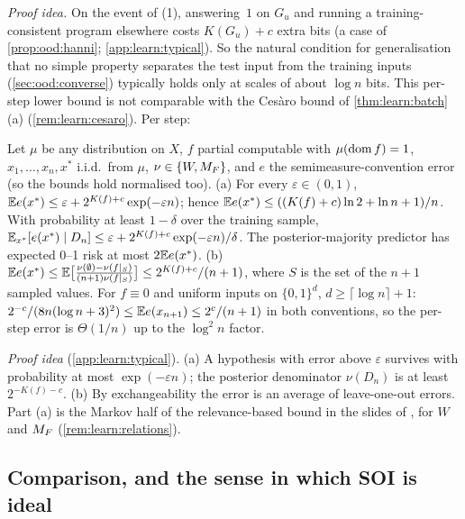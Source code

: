 \emph{Proof idea.} On the event of (1), answering~$1$ on $G_u$ and running a training-consistent program elsewhere costs $K(G_u)+c$ extra bits (a case of \cref{prop:ood:hanni}; \cref{app:learn:typical}). So the natural condition for generalisation that no simple property separates the test input from the training inputs (\cref{sec:ood:converse}) typically holds only at scales of about $\log n$ bits. This per-step lower bound is not comparable with the Ces\`aro bound of \cref{thm:learn:batch}(a) (\cref{rem:learn:cesaro}). Per step:

\begin{corollary}\label{cor:learn:perstep}
Let $\mu$ be any distribution on $X$, $f$ partial computable with $\mu(\operatorname{dom} f)=1$, $x_1,\dots,x_n,x^*$ i.i.d.\ from $\mu$, $\nu\in\{W,M_{F}\}$, and $e$ the semimeasure-convention error (so the bounds hold normalised too).
(a) For every $\varepsilon\in(0,1)$, $\mathbb{E} e(x^*)\le\varepsilon+2^{K(f)+c}\exp(-\varepsilon n)$; hence $\mathbb{E} e(x^*)\le((K(f)+c)\ln2+\ln n+1)/n$. With probability at least $1-\delta$ over the training sample, $\mathbb{E}_{x^*}[e(x^*)\mid D_n]\le\varepsilon+2^{K(f)+c}\exp(-\varepsilon n)/\delta$. The posterior-majority predictor has expected 0--1 risk at most $2\mathbb{E} e(x^*)$.
(b) $\mathbb{E} e(x^*)\le\mathbb{E}\big[\frac{\nu(\emptyset)-\nu(f|_S)}{(n+1)\nu(f|_S)}\big]\le2^{K(f)+c}/(n+1)$, where $S$ is the set of the $n+1$ sampled values.
For $f\equiv0$ and uniform inputs on $\{0,1\}^d$, $d\ge\lceil\log n\rceil+1$: $2^{-c}/(8n(\log n+3)^2)\le\mathbb{E} e(x_{n+1})\le2^{c}/(n+1)$ in both conventions, so the per-step error is $\Theta(1/n)$ up to the $\log^2n$ factor.
\end{corollary}

\emph{Proof idea} (\cref{app:learn:typical}). (a) A hypothesis with error above $\varepsilon$ survives with probability at most $\exp(-\varepsilon n)$; the posterior denominator $\nu(D_n)$ is at least $2^{-K(f)-c}$. (b) By exchangeability the error is an average of leave-one-out errors. Part (a) is the Markov half of the relevance-based bound in the slides of \citet{vaintrobhanni2026nnbayes}, for $W$ and $M_{F}$ (\cref{rem:learn:relations}).

\subsection{Comparison, and the sense in which SOI is ideal}\label{sec:learn:ideal}

